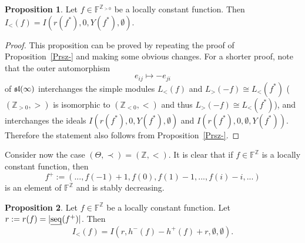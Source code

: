 \documentclass[10pt]{amsart}\oddsidemargin -1mm \evensidemargin -1mm \topmargin -15mm\headheight5mm \headsep 3.5mm \textheight 245mm\textwidth 170mm
\theoremstyle{definition}\newtheorem{theorem}{Theorem}[section]\newtheorem{lemma}[theorem]{Lemma}\newtheorem{remark}[theorem]{Remark}\newtheorem{proposition}[theorem]{Proposition}\newtheorem{corollary}[theorem]{Corollary}\newtheorem{definition}[theorem]{Definition}\newtheorem{Ex}[theorem]{Example}\newtheorem{obs}[theorem]{Observation}\newtheorem{nota}[theorem]{Notation}
\begin{document}
\begin{proposition}\label{Prsz+}Let $f\in\mathbb F^{\mathbb Z_{>0}}$ be a locally constant function. 
Then $I_<(f)=I(r(f^*), 0, {Y}(f^*), \emptyset).$
\end{proposition}
\begin{proof} This proposition can be proved by repeating the proof of Proposition~\ref{Prsz-} and making some obvious changes. 
For a shorter proof, note that the outer automorphism 
$$e_{ij}\mapsto-e_{ji}$$
of $\frak{sl}(\infty)$ interchanges the simple modules $L_<(f)$ and $L_>(-f)\cong L_<(f^*)$ ($(\mathbb Z_{>0}, >)$ is isomorphic to $(\mathbb Z_{<0}, <)$ and thus $L_>(-f)\cong L_<(f^*)$), and interchanges the ideals $I(r(f^*), 0, {Y}(f^*), \emptyset)$ and $I(r(f^*), 0, \emptyset, {Y}(f^*))$. 
Therefore the statement also follows from Proposition~\ref{Prsz-}.
\end{proof}
Consider now the case $(\Theta, \prec)=(\mathbb Z, <)$. It is clear that if $f\in\mathbb F^{\mathbb Z}$ is a locally constant function, then
$$f^+:=(..., f(-1)+1, f(0), f(1)-1,..., f(i)-i,...)$$
is an element of $\mathbb F^{\mathbb Z}$ and is stably decreasing.
\begin{proposition}\label{Prsz}Let $f\in\mathbb F^{\mathbb Z}$ be a locally constant function. Let $r:=r(f)=|{\rm\underline{seq}}(f^+)|$.
Then $$I_<(f)=I(r, h^-(f)-h^+(f)+r, \emptyset, \emptyset).$$
\end{proposition}
\end{document}

